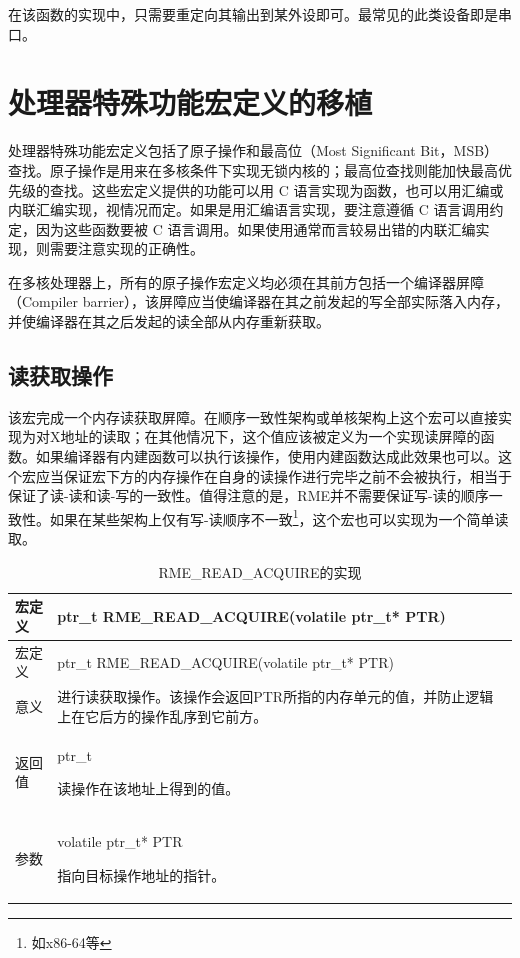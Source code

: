在该函数的实现中，只需要重定向其输出到某外设即可。最常见的此类设备即是串口。

\section{处理器特殊功能宏定义的移植}\label{sec:7-processor-special-function-macro-porting}

处理器特殊功能宏定义包括了原子操作和最高位（Most
Significant
Bit，MSB）查找。原子操作是用来在多核条件下实现无锁内核的；最高位查找则能加快最高优先级的查找。这些宏定义提供的功能可以用 C 语言实现为函数，也可以用汇编或内联汇编实现，视情况而定。如果是用汇编语言实现，要注意遵循 C 语言调用约定，因为这些函数要被 C 语言调用。如果使用通常而言较易出错的内联汇编实现，则需要注意实现的正确性。

在多核处理器上，所有的原子操作宏定义均必须在其前方包括一个编译器屏障（Compiler
barrier），该屏障应当使编译器在其之前发起的写全部实际落入内存，并使编译器在其之后发起的读全部从内存重新获取。

\subsection{读获取操作}\label{subsec:7-read-acquire-operation}

该宏完成一个内存读获取屏障。在顺序一致性架构或单核架构上这个宏可以直接实现为对X地址的读取；在其他情况下，这个值应该被定义为一个实现读屏障的函数。如果编译器有内建函数可以执行该操作，使用内建函数达成此效果也可以。这个宏应当保证宏下方的内存操作在自身的读操作进行完毕之前不会被执行，相当于保证了读-读和读-写的一致性。值得注意的是，RME并不需要保证写-读的顺序一致性。如果在某些架构上仅有写-读顺序不一致\footnote{如x86-64等}，这个宏也可以实现为一个简单读取。

\begin{xltabular}{\textwidth}{@{}>{\hsize\raggedright\arraybackslash}X>{\hsize\raggedright\arraybackslash}X@{}}
\caption{RME\_READ\_ACQUIRE的实现}\label{tab:7-29-rme-read-acquire-implementation}\\
\toprule
宏定义 & ptr\_t RME\_READ\_ACQUIRE(volatile ptr\_t* PTR)\tabularnewline
\endfirsthead
\toprule
宏定义 & ptr\_t RME\_READ\_ACQUIRE(volatile ptr\_t* PTR)\tabularnewline
\midrule
\endhead
\bottomrule
\endlastfoot
意义 &
进行读获取操作。该操作会返回PTR所指的内存单元的值，并防止逻辑上在它后方的操作乱序到它前方。\tabularnewline
返回值\strut
 & ptr\_t

读操作在该地址上得到的值。\strut
\tabularnewline
参数\strut
 & volatile ptr\_t* PTR

指向目标操作地址的指针。\strut
\tabularnewline
\end{xltabular}

